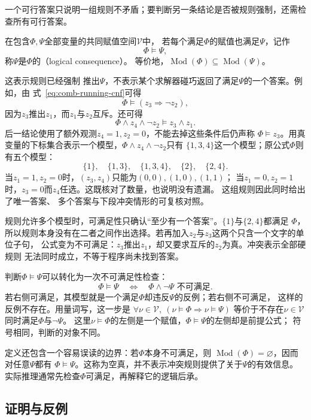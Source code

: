一个可行答案只说明一组规则不矛盾；要判断另一条结论是否被规则强制，还需检查所有可行答案。
\begin{definition}[逻辑后承]
\label{def:comb-logical-consequence}
在包含$\Phi,\Psi$全部变量的共同赋值空间$\mathcal{V}$中，
若每个满足$\Phi$的赋值也满足$\Psi$，记作
\[
  \Phi\models\Psi,
\]
称$\Psi$是$\Phi$的（logical consequence）。
等价地，$\operatorname{Mod}(\Phi)\subseteq\operatorname{Mod}(\Psi)$。
\end{definition}
这表示规则已经强制
推出$\Psi$，不表示某个求解器碰巧返回了满足$\Psi$的一个答案。例如，由
式~\eqref{eq:comb-running-cnf}可得
\[
  \Phi\models(z_3\Rightarrow\neg z_2),
\]
因为$z_3$推出$z_1$，而$z_1$与$z_2$互斥。还可得
\[
  \Phi\land z_4\land\neg z_2
  \models z_3\land z_1.
\]
后一结论使用了额外观测$z_4=1,z_2=0$，不能去掉这些条件后仍声称
$\Phi\models z_3$。用真变量的下标集合表示一个模型，$\Phi\land z_4\land\neg z_2$只有
$\{1,3,4\}$这一个模型；原公式$\Phi$则有五个模型：
\[
  \{1\},\quad\{1,3\},\quad\{1,3,4\},\quad\{2\},\quad\{2,4\}.
\]
当$z_1=1,z_2=0$时，$(z_3,z_4)$只能为$(0,0),(1,0),(1,1)$；
当$z_1=0,z_2=1$时，$z_3=0$而$z_4$任选。这既核对了数量，也说明没有遗漏。
这组规则因此同时给出了唯一答案、
多个答案与下段冲突情形的可复核对照。

规则允许多个模型时，可满足性只确认“至少有一个答案”。$\{1\}$与$\{2,4\}$都满足
$\Phi$，所以规则本身没有在二者之间作出选择。若再加入$z_2$与$z_3$这两个只含一个文字的单位子句，
公式变为不可满足：$z_3$推出$z_1$，却又要求互斥的$z_2$为真。冲突表示全部硬规则
无法同时成立，不等于程序尚未找到答案。

判断$\Phi\models\Psi$可以转化为一次不可满足性检查：
\begin{equation}
  \Phi\models\Psi
  \quad\Longleftrightarrow\quad
  \Phi\land\neg\Psi\text{ 不可满足}.
  \label{eq:comb-entailment-unsat}
\end{equation}
若右侧可满足，其模型就是一个满足$\Phi$却违反$\Psi$的反例；若右侧不可满足，
这样的反例不存在。用量词写，这一步是
$\forall\nu\in\mathcal{V},\ (\nu\models\Phi\Rightarrow\nu\models\Psi)$
等价于不存在$\nu\in\mathcal{V}$同时满足$\Phi$与$\neg\Psi$。
这里$\nu\models\Phi$的左侧是一个赋值，$\Phi\models\Psi$的左侧却是前提公式；
符号相同，判断的对象不同。

定义还包含一个容易误读的边界：若$\Phi$本身不可满足，则
$\operatorname{Mod}(\Phi)=\varnothing$，因而对任意$\Psi$都有
$\Phi\models\Psi$。这称为空真，并不表示冲突规则提供了关于$\Psi$的有效信息。
实际推理通常先检查$\Phi$可满足，再解释它的逻辑后承。

\subsection{证明与反例}
\label{sec:prelim-proofs-constructions-counterexamples}

